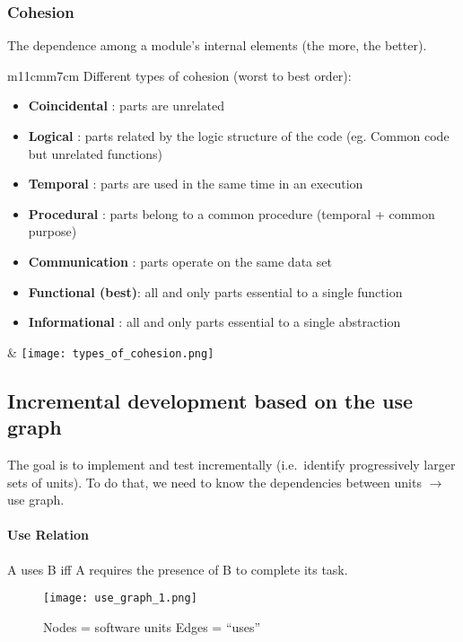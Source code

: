 \subsubsection{Cohesion}

The dependence among a module's internal elements (the more, the better). 

\begin{tabular}{m{11cm}m{7cm}}
Different types of cohesion (worst to best order):
\begin{itemize}
\item \textbf{Coincidental     }: parts are unrelated
\item \textbf{Logical          }: parts related by the logic structure of the code (eg. Common code but unrelated functions)
\item \textbf{Temporal         }: parts are used in the same time in an execution
\item \textbf{Procedural       }: parts belong to a common procedure (temporal + common purpose)
\item \textbf{Communication    }: parts operate on the same data set
\item \textbf{Functional (best)}: all and only parts essential to a single function
\item \textbf{Informational    }: all and only parts essential to a single abstraction
\end{itemize}
&
    \texttt{[image: types\_of\_cohesion.png]}
\end{tabular}


\subsection{Incremental development based on the use graph}

The goal is to implement and test incrementally (i.e.\ identify progressively larger sets of
units). To do that, we need to know the dependencies between units $\rightarrow$ use graph.

\paragraph{Use Relation} A uses B iff A requires the presence of B to complete its task.

 
\begin{figure}[!ht]
    \begin{minipage}{\linewidth}
        \begin{minipage}{0.45\linewidth}
            \texttt{[image: use\_graph\_1.png]}
        \end{minipage}
        \begin{minipage}{0.45\linewidth}
            Nodes = software units \newline
            Edges = \enquote{uses}
        \end{minipage}
    \end{minipage}
\end{figure}

